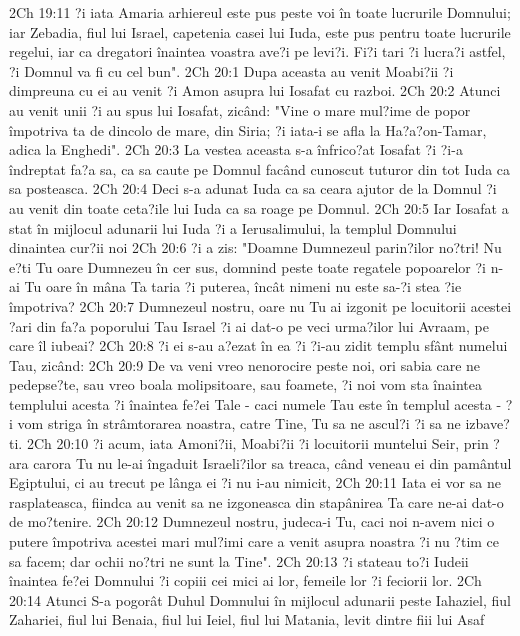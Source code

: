2Ch 19:11  ?i iata Amaria arhiereul este pus peste voi în toate lucrurile Domnului; iar Zebadia, fiul lui Israel, capetenia casei lui Iuda, este pus pentru toate lucrurile regelui, iar ca dregatori înaintea voastra ave?i pe levi?i. Fi?i tari ?i lucra?i astfel, ?i Domnul va fi cu cel bun".
2Ch 20:1  Dupa aceasta au venit Moabi?ii ?i dimpreuna cu ei au venit ?i Amon asupra lui Iosafat cu razboi.
2Ch 20:2  Atunci au venit unii ?i au spus lui Iosafat, zicând: "Vine o mare mul?ime de popor împotriva ta de dincolo de mare, din Siria; ?i iata-i se afla la Ha?a?on-Tamar, adica la Enghedi".
2Ch 20:3  La vestea aceasta s-a înfrico?at Iosafat ?i ?i-a îndreptat fa?a sa, ca sa caute pe Domnul facând cunoscut tuturor din tot Iuda ca sa posteasca.
2Ch 20:4  Deci s-a adunat Iuda ca sa ceara ajutor de la Domnul ?i au venit din toate ceta?ile lui Iuda ca sa roage pe Domnul.
2Ch 20:5  Iar Iosafat a stat în mijlocul adunarii lui Iuda ?i a Ierusalimului, la templul Domnului dinaintea cur?ii noi
2Ch 20:6  ?i a zis: "Doamne Dumnezeul parin?ilor no?tri! Nu e?ti Tu oare Dumnezeu în cer sus, domnind peste toate regatele popoarelor ?i n-ai Tu oare în mâna Ta taria ?i puterea, încât nimeni nu este sa-?i stea ?ie împotriva?
2Ch 20:7  Dumnezeul nostru, oare nu Tu ai izgonit pe locuitorii acestei ?ari din fa?a poporului Tau Israel ?i ai dat-o pe veci urma?ilor lui Avraam, pe care îl iubeai?
2Ch 20:8  ?i ei s-au a?ezat în ea ?i ?i-au zidit templu sfânt numelui Tau, zicând:
2Ch 20:9  De va veni vreo nenorocire peste noi, ori sabia care ne pedepse?te, sau vreo boala molipsitoare, sau foamete, ?i noi vom sta înaintea templului acesta ?i înaintea fe?ei Tale - caci numele Tau este în templul acesta - ?i vom striga în strâmtorarea noastra, catre Tine, Tu sa ne ascul?i ?i sa ne izbave?ti.
2Ch 20:10  ?i acum, iata Amoni?ii, Moabi?ii ?i locuitorii muntelui Seir, prin ?ara carora Tu nu le-ai îngaduit Israeli?ilor sa treaca, când veneau ei din pamântul Egiptului, ci au trecut pe lânga ei ?i nu i-au nimicit,
2Ch 20:11  Iata ei vor sa ne rasplateasca, fiindca au venit sa ne izgoneasca din stapânirea Ta care ne-ai dat-o de mo?tenire.
2Ch 20:12  Dumnezeul nostru, judeca-i Tu, caci noi n-avem nici o putere împotriva acestei mari mul?imi care a venit asupra noastra ?i nu ?tim ce sa facem; dar ochii no?tri ne sunt la Tine".
2Ch 20:13  ?i stateau to?i Iudeii înaintea fe?ei Domnului ?i copiii cei mici ai lor, femeile lor ?i feciorii lor.
2Ch 20:14  Atunci S-a pogorât Duhul Domnului în mijlocul adunarii peste Iahaziel, fiul Zahariei, fiul lui Benaia, fiul lui Ieiel, fiul lui Matania, levit dintre fiii lui Asaf
